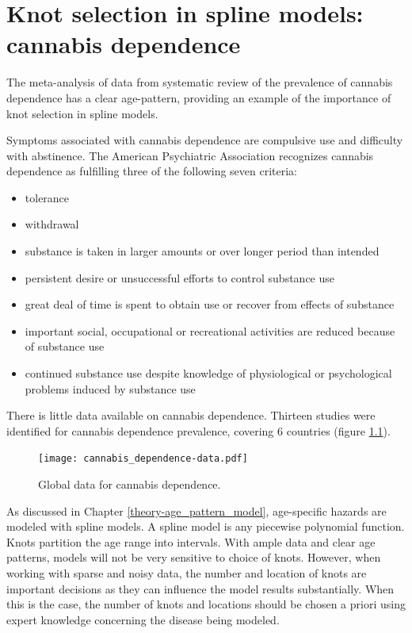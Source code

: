 \chapter{Knot selection in spline models: cannabis dependence}
\label{applications-splines_knot_loc}

The meta-analysis of data from systematic review of the prevalence of cannabis dependence has a clear age-pattern, providing an example of the importance of knot selection in spline models.

Symptoms associated with cannabis dependence are compulsive use and difficulty with abstinence.  The American Psychiatric Association recognizes cannabis dependence as fulfilling three of the following seven criteria:
    \begin{itemize}
        \item tolerance
        \item withdrawal
        \item substance is taken in larger amounts or over longer period than intended
        \item persistent desire or unsuccessful efforts to control substance use
        \item great deal of time is spent to obtain use or recover from effects of substance
        \item important social, occupational or recreational activities are reduced because of substance use
        \item continued substance use despite knowledge of physiological or psychological problems induced by substance use \cite{american_diagnostic_2000, coffey_cannabis_2002}
    \end{itemize}

There is little data available on cannabis dependence.  Thirteen studies were identified for cannabis dependence prevalence, covering 6 countries (figure \ref{fig:app-cannabis_data}).

    \begin{figure}[h]
        \begin{center}
            \texttt{[image: cannabis\_dependence-data.pdf]}
            \caption{Global data for cannabis dependence.}
            \label{fig:app-cannabis_data}
        \end{center}
    \end{figure}

As discussed in Chapter \ref{theory-age_pattern_model}, age-specific hazards are modeled with spline models.  A spline model is any piecewise polynomial function.  Knots partition the age range into intervals.  With ample data and clear age patterns, models will not be very sensitive to choice of knots.  However, when working with sparse and noisy data, the number and location of knots are important decisions as they can influence the model results substantially.  When this is the case, the number of knots and locations should be chosen a priori using expert knowledge concerning the disease being modeled.

